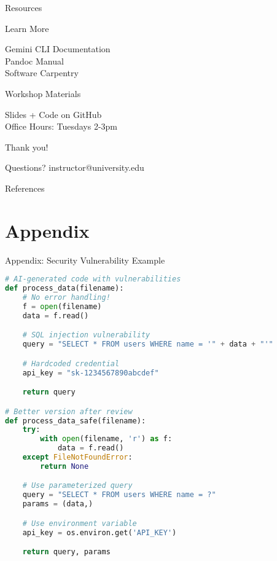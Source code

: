 \documentclass[aspectratio=169]{beamer}
\begin{document}
\begin{frame}{Resources}
  \centering
  \large\bfseries

  Learn More

  \vspace{0.5cm}
  \normalsize

  Gemini CLI Documentation\\
  Pandoc Manual\\
  Software Carpentry \cite{carpentry2024software}

  \vspace{0.8cm}
  \large\bfseries

  Workshop Materials

  \vspace{0.5cm}
  \normalsize
  Slides + Code on GitHub\\
  Office Hours: Tuesdays 2-3pm

  \vspace{0.8cm}
  \large\bfseries

  Thank you!

  \vspace{0.3cm}
  \normalsize
  Questions? instructor@university.edu
\end{frame}

\begin{frame}[allowframebreaks]{References}
  \printbibliography
\end{frame}

\appendix
\section{Appendix}

\begin{frame}[fragile]{Appendix: Security Vulnerability Example}
  \begin{lstlisting}[language=python, basicstyle=\tiny\ttfamily]
# AI-generated code with vulnerabilities
def process_data(filename):
    # No error handling!
    f = open(filename)
    data = f.read()

    # SQL injection vulnerability
    query = "SELECT * FROM users WHERE name = '" + data + "'"

    # Hardcoded credential
    api_key = "sk-1234567890abcdef"

    return query

# Better version after review
def process_data_safe(filename):
    try:
        with open(filename, 'r') as f:
            data = f.read()
    except FileNotFoundError:
        return None

    # Use parameterized query
    query = "SELECT * FROM users WHERE name = ?"
    params = (data,)

    # Use environment variable
    api_key = os.environ.get('API_KEY')

    return query, params
  \end{lstlisting}
\end{frame}
\end{document}
